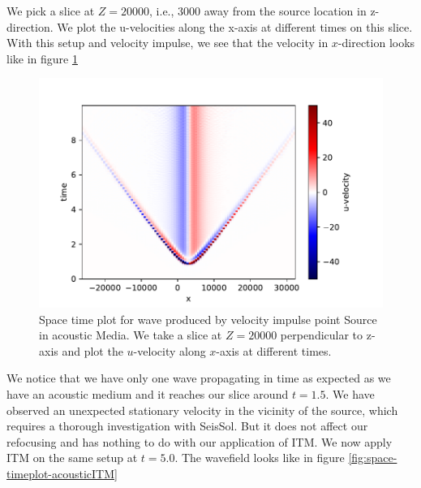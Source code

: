 We pick a slice at $Z=20000$, i.e., 3000 away from the source location in z-direction.
We plot the u-velocities along the x-axis at different times on this slice. With this setup and velocity impulse, we see that the velocity in $x$-direction
looks like in figure \ref{fig:space-timeplot-acousticnoITM}
\begin{figure}[htpb]
    \centering
    \includegraphics[width=0.9\linewidth]{figures/Acoustic-noITM.pdf}
    \caption{Space time plot for wave produced by velocity impulse point Source in acoustic Media. We take a slice at $Z=20000$ perpendicular to z-axis 
    and plot the $u$-velocity along $x$-axis at different times.}
    \label{fig:space-timeplot-acousticnoITM}
\end{figure}

We notice that we have only one wave propagating in time as expected as we have an acoustic medium and it reaches our slice around $t=1.5$. 
We have observed an unexpected stationary velocity in the vicinity of the source, which requires a thorough investigation with SeisSol. But it does not affect our refocusing and has nothing to do with
our application of \ac{ITM}. We now apply ITM on the same setup at $t=5.0$. The wavefield looks like in figure \ref{fig:space-timeplot-acousticITM}

